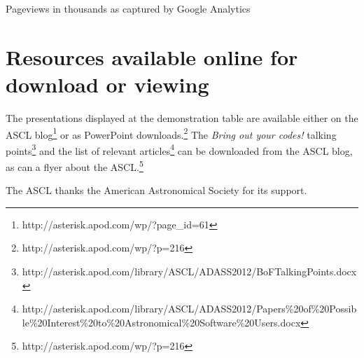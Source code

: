 \documentclass[11pt,twoside]{article}
\begin{document}
{Pageviews in thousands as captured by Google Analytics}


\section{Resources available online for download or viewing}
The presentations displayed at the demonstration table are available either on the ASCL blog\footnote{http://asterisk.apod.com/wp/?page\_id=61} or as PowerPoint downloads.\footnote{http://asterisk.apod.com/wp/?p=216} The {\em Bring out your codes!} talking points\footnote{http://asterisk.apod.com/library/ASCL/ADASS2012/BoFTalkingPoints.docx} and the list of relevant articles\footnote{http://asterisk.apod.com/library/ASCL/ADASS2012/Papers\%20of\%20Possible\%20Interest\%20to\%20Astronomical\%20Software\%20Users.docx} can be downloaded from the ASCL blog, as can a flyer about the ASCL.\footnote{http://asterisk.apod.com/wp/?p=216}


\acknowledgements The ASCL thanks the American Astronomical Society for its support.


\end{document}
